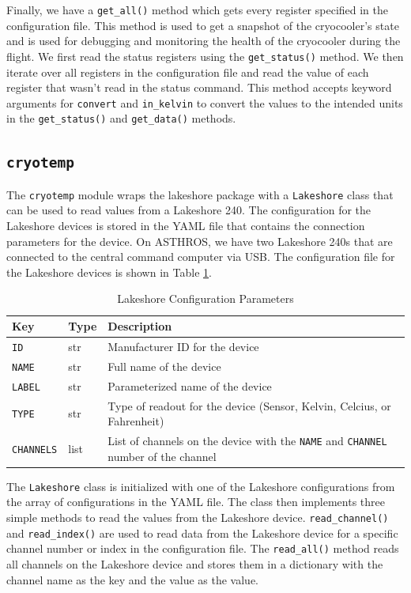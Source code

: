 Finally, we have a \texttt{get\_all()} method which gets every register specified in the configuration file.
This method is used to get a snapshot of the cryocooler's state and is used for debugging and monitoring the health of the cryocooler during the flight. 
We first read the status registers using the \texttt{get\_status()} method.
We then iterate over all registers in the configuration file and read the value of each register
that wasn't read in the status command.
This method accepts keyword arguments for \texttt{convert} and \texttt{in\_kelvin} to convert the values to the intended units in the \texttt{get\_status()} and \texttt{get\_data()} methods.

\subsection{\texttt{cryotemp}}
The \texttt{cryotemp} module wraps the lakeshore package with a \texttt{Lakeshore} class that can be used to read values from a Lakeshore 240. 
The configuration for the Lakeshore devices is stored in the YAML file that contains the connection parameters for the device.
On ASTHROS, we have two Lakeshore 240s that are connected to the central command computer via USB.
The configuration file for the Lakeshore devices is shown in Table \ref{chap2/table:lakeshore_config}.

\begin{table}[ht!]
    \centering
    \begin{tabularx}{\textwidth}{l|l|X}
        \textbf{Key} & \textbf{Type} & \textbf{Description} \\ \hline    
        \texttt{ID} & str & Manufacturer ID for the device \\
        \texttt{NAME} & str & Full name of the device \\
        \texttt{LABEL} & str & Parameterized name of the device \\
        \texttt{TYPE} & str & Type of readout for the device (Sensor, Kelvin, Celcius, or Fahrenheit) \\
        \texttt{CHANNELS} & list & List of channels on the device with the \texttt{NAME} and \texttt{CHANNEL} number of the channel
    \end{tabularx}
    \label{chap2/table:lakeshore_config}
    \caption{Lakeshore Configuration Parameters}
\end{table}

The \texttt{Lakeshore} class is initialized with one of the Lakeshore configurations from the array of configurations in the YAML file.
The class then implements three simple methods to read the values from the Lakeshore device.
\texttt{read\_channel()} and \texttt{read\_index()} are used to read data from the Lakeshore device for a specific channel number or index in the configuration file.
The \texttt{read\_all()} method reads all channels on the Lakeshore device and stores them in a dictionary with the channel name as the key and the value as the value.

